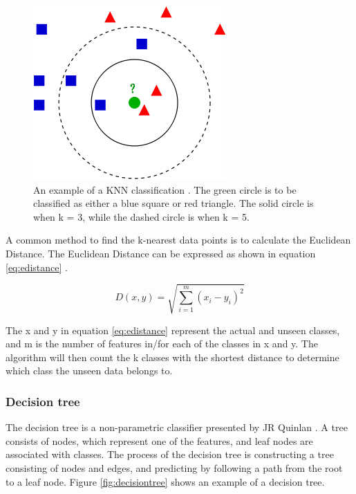 \documentclass[USenglish]{ifimaster}  %
\begin{document}
\begin{figure}[h]
		\centering
		\includegraphics[scale=0.5]{Figures/KNN.png}
		\caption[An example of KNN classification]{An example of a KNN classification \cite{KnnClassification}. The green circle is to be classified as either a blue square or red triangle. The solid circle is when k = 3, while the dashed circle is when k = 5.}
		\label{fig:KNN}
\end{figure}
	
A common method to find the k-nearest data points is to calculate the Euclidean Distance. The Euclidean Distance can be expressed as shown in equation \ref{eq:edistance}  \cite{Bao2004}.
	
\begin{equation}
	D(x,y)=\sqrt{\sum_{i=1}^{m}(x_{i}-y_{i})^2}
	\label{eq:edistance}
\end{equation}

The x and y in equation \ref{eq:edistance} represent the actual and unseen classes, and m is the number of features in/for each of the classes in x and y. The algorithm will then count the k classes with the shortest distance to determine which class the unseen data belongs to.
	
	
\subsubsection{Decision tree}
The decision tree is a non-parametric classifier presented by JR Quinlan \cite{Quinlan1986}. A tree consists of nodes, which represent one of the features, and leaf nodes are associated with classes. The process of the decision tree is constructing a tree consisting of nodes and edges, and predicting by following a path from the root to a leaf node. Figure \ref{fig:decisiontree} shows an example of a decision tree.
\end{document}
